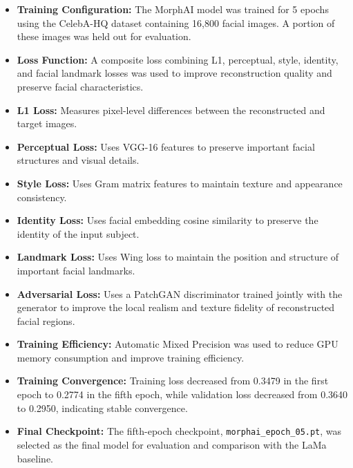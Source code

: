 \begin{itemize}
    \item \textbf{Training Configuration:} The MorphAI model was trained for 5 epochs using the CelebA-HQ dataset containing 16,800 facial images. A portion of these images was held out for evaluation.
    
    \item \textbf{Loss Function:} A composite loss combining L1, perceptual,
    style, identity, and facial landmark losses was used to improve
    reconstruction quality and preserve facial characteristics.
    
    \item \textbf{L1 Loss:} Measures pixel-level differences between the
    reconstructed and target images.
    
    \item \textbf{Perceptual Loss:} Uses VGG-16 features to preserve important
    facial structures and visual details.
    
    \item \textbf{Style Loss:} Uses Gram matrix features to maintain texture
    and appearance consistency.
    
    \item \textbf{Identity Loss:} Uses facial embedding cosine similarity to
    preserve the identity of the input subject.
    
    \item \textbf{Landmark Loss:} Uses Wing loss to maintain the position and
    structure of important facial landmarks.

    \item \textbf{Adversarial Loss:} Uses a PatchGAN discriminator trained
jointly with the generator to improve the local realism and texture
fidelity of reconstructed facial regions.
    
    \item \textbf{Training Efficiency:} Automatic Mixed Precision was used
    to reduce GPU memory consumption and improve training efficiency.
    
    \item \textbf{Training Convergence:} Training loss decreased from
    0.3479 in the first epoch to 0.2774 in the fifth epoch, while validation
    loss decreased from 0.3640 to 0.2950, indicating stable convergence.
    
    \item \textbf{Final Checkpoint:} The fifth-epoch checkpoint,
    \texttt{morphai\_epoch\_05.pt}, was selected as the final model for
    evaluation and comparison with the LaMa baseline.
\end{itemize}

